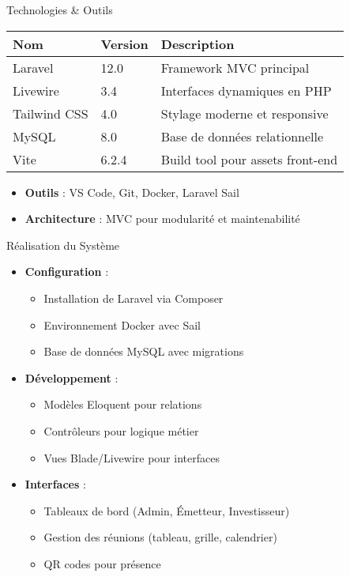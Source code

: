 \documentclass{beamer}
\begin{document}
\begin{frame}{Technologies \& Outils}
\begin{table}
\begin{tabular}{l l l}
\toprule
\textbf{Nom} & \textbf{Version} & \textbf{Description} \\
\midrule
Laravel & 12.0 & Framework MVC principal \\
Livewire & 3.4 & Interfaces dynamiques en PHP \\
Tailwind CSS & 4.0 & Stylage moderne et responsive \\
MySQL & 8.0 & Base de données relationnelle \\
Vite & 6.2.4 & Build tool pour assets front-end \\
\bottomrule
\end{tabular}
\end{table}
\begin{itemize}
    \item \textbf{Outils} : VS Code, Git, Docker, Laravel Sail
    \item \textbf{Architecture} : MVC pour modularité et maintenabilité
\end{itemize}
\end{frame}

\begin{frame}{Réalisation du Système}
\begin{itemize}
    \item \textbf{Configuration} :
    \begin{itemize}
        \item Installation de Laravel via Composer
        \item Environnement Docker avec Sail
        \item Base de données MySQL avec migrations
    \end{itemize}
    \item \textbf{Développement} :
    \begin{itemize}
        \item Modèles Eloquent pour relations
        \item Contrôleurs pour logique métier
        \item Vues Blade/Livewire pour interfaces
    \end{itemize}
    \item \textbf{Interfaces} :
    \begin{itemize}
        \item Tableaux de bord (Admin, Émetteur, Investisseur)
        \item Gestion des réunions (tableau, grille, calendrier)
        \item QR codes pour présence
    \end{itemize}
\end{itemize}
\end{frame}
\end{document}
